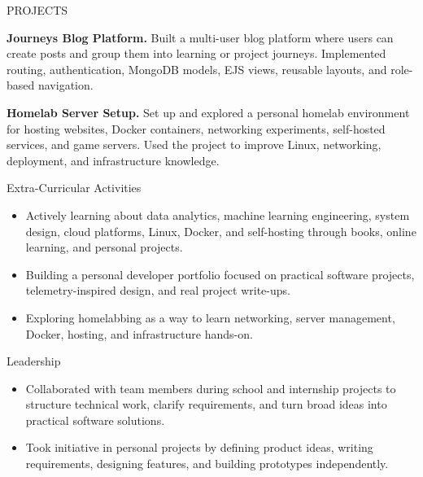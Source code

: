 \documentclass{resume}
\begin{document}
\vspace{5em}
\begin{rSection}{PROJECTS}
\vspace{-1.25em}

\item \textbf{Journeys Blog Platform.} {Built a multi-user blog platform where users can create posts and group them into learning or project journeys. Implemented routing, authentication, MongoDB models, EJS views, reusable layouts, and role-based navigation.}

\item \textbf{Homelab Server Setup.} {Set up and explored a personal homelab environment for hosting websites, Docker containers, networking experiments, self-hosted services, and game servers. Used the project to improve Linux, networking, deployment, and infrastructure knowledge.}

\end{rSection} 


\begin{rSection}{Extra-Curricular Activities} 
\begin{itemize}
    \item Actively learning about data analytics, machine learning engineering, system design, cloud platforms, Linux, Docker, and self-hosting through books, online learning, and personal projects.
    \item Building a personal developer portfolio focused on practical software projects, telemetry-inspired design, and real project write-ups.
    \item Exploring homelabbing as a way to learn networking, server management, Docker, hosting, and infrastructure hands-on.
\end{itemize}

\end{rSection}


\begin{rSection}{Leadership} 
\begin{itemize}
    \item Collaborated with team members during school and internship projects to structure technical work, clarify requirements, and turn broad ideas into practical software solutions.
    \item Took initiative in personal projects by defining product ideas, writing requirements, designing features, and building prototypes independently.
\end{itemize}

\end{rSection}
\end{document}
